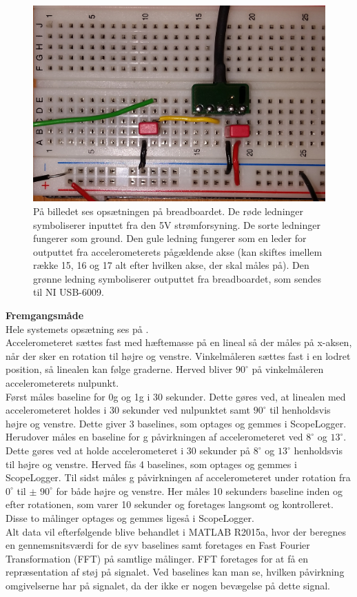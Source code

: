 \begin{figure}[H]\label{pforsoeg1}
	\centering
	\includegraphics[scale=0.15]{figures/cProblemloesning/PF2.jpg}
	\caption{På billedet ses opsætningen på breadboardet. De røde ledninger symboliserer inputtet fra den 5V strømforsyning. De sorte ledninger fungerer som ground. Den gule ledning fungerer som en leder for outputtet fra accelerometerets pågældende akse (kan skiftes imellem række 15, 16 og 17 alt efter hvilken akse, der skal måles på). Den grønne ledning symboliserer outputtet fra breadboardet, som sendes til NI USB-6009.}
\end{figure}

\noindent\textbf{Fremgangsmåde}\\
Hele systemets opsætning ses på . \\
Accelerometeret sættes fast med hæftemasse på en lineal så der måles på x-aksen, når der sker en rotation til højre og venstre. Vinkelmåleren sættes fast i en lodret position, så linealen kan følge graderne. Herved bliver $90^{\circ}$ på vinkelmåleren accelerometerets nulpunkt. \\
Først måles baseline for 0g og 1g i 30 sekunder. Dette gøres ved, at linealen med accelerometeret holdes i 30 sekunder ved nulpunktet samt $90^{\circ}$ til henholdsvis højre og venstre. Dette giver 3 baselines, som optages og gemmes i ScopeLogger. Herudover måles en baseline for g påvirkningen af accelerometeret ved $8^{\circ}$ og $13^{\circ}$. Dette gøres ved at holde accelerometeret i 30 sekunder på $8^{\circ}$ og $13^{\circ}$ henholdsvis til højre og venstre. Herved fås 4 baselines, som optages og gemmes i ScopeLogger.
Til sidst måles g påvirkningen af accelerometeret under rotation fra $0^{\circ}$ til $\pm$ $90^{\circ}$ for både højre og venstre. Her måles 10 sekunders baseline inden og efter rotationen, som varer 10 sekunder og foretages langsomt og kontrolleret. Disse to målinger optages og gemmes ligeså i ScopeLogger. \\
Alt data vil efterfølgende blive behandlet i MATLAB R2015a, hvor der beregnes en gennemsnitsværdi for de syv baselines samt foretages en Fast Fourier Transformation (FFT) på samtlige målinger. FFT foretages for at få en repræsentation af støj på signalet. Ved baselines kan man se, hvilken påvirkning omgivelserne har på signalet, da der ikke er nogen bevægelse på dette signal.

